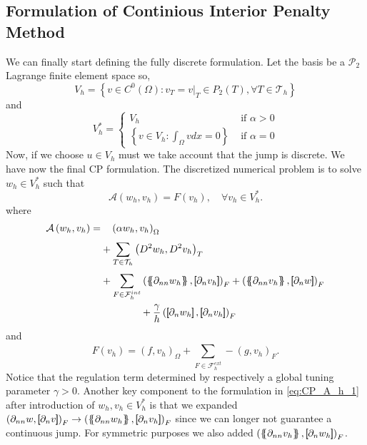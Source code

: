 \subsection{Formulation of Continious Interior Penalty Method}%
\label{sub:formulation_of_continious_interior_penalty_method}


We can finally start defining the fully discrete formulation. Let the basis be a $\mathcal{P}_{2} $ Lagrange finite element space so,
\[
V_{h} = \left\{ v \in C^{0}\left( \Omega  \right): v_{T} = v | _{T} \in P_{2}\left( T \right), \forall T \in
\mathcal{T}_{h}    \right\}
\]
and
\[
V_{h}^{*} = \begin{cases}
    V_{h} & \text{ if } \alpha  > 0 \\
    \left\{ v \in V_{h}: \int_{\Omega }^{} v dx   = 0   \right\} &  \text{ if } \alpha   = 0
\end{cases}
\]
Now, if we choose $u \in V_{h}$ must we take account that the jump is discrete.
 We have now the final CP formulation.
The discretized numerical problem is to solve $w_{h} \in V_{h}^{*}$ such that
\begin{equation}
\label{eq:CP_A_F}
\mathcal{A}\left( w_{h}, v_{h} \right)   = F\left( v_{h} \right), \quad \forall v_{h} \in V_{h}^{*}  .
\end{equation}
where
\begin{equation}
\label{eq:CP_A_h_1}
\begin{split}
\mathcal{A} \left( w_{h}, v_{h} \right)   =&
  \quad  \left( \alpha  w_{h}, v_{h} \right) _{\Omega }\\
&  + \sum_{T \in \mathcal{T} _{h}}^{} \left( D^2 w_{h}, D^2v_{h} \right) _{T} \\
 & +
  \sum_{F \in \mathcal{F}_{h}^{int} }^{}
  \left( \mean{  \partial _{n n} w_{h} }, \jump{ \partial _{n }v_{h}} \right)_{F}  +
 \left( \mean{ \partial _{n n} v_{h} }, \jump{ \partial _{n}w }      \right)_{F} \\
& \quad \quad \quad \quad  + \frac{\gamma}{h}  \left( \jump{ \partial _{n} w_{h}}, \jump{ \partial _{n} v_{h}   }   \right)_{F}
\end{split}
\end{equation}
and
\begin{equation}
\label{eq:CP_F_h}
F\left( v_{h} \right)  = \left( f, v_{h} \right) _{\Omega } +  \sum_ {F \in \mathcal{F}_{h} ^{ext}}^{} - \left(g, v_{h}  \right) _{F}.
\end{equation}
Notice that the regulation term determined by respectively a global tuning parameter $\gamma >0 $. Another key component to the formulation
in \eqref{eq:CP_A_h_1} after introduction of $ w_{h}, v_{h} \in V^{*}_{h}$  is that we expanded $\left( \partial _{nn}w, \jump{ \partial _{n} v }  \right)_{F} \to \left( \mean{ \partial _{nn}w_{h} }  , \jump{ \partial _{n} v_{h} }  \right)_{F} $ since we can longer not guarantee a
continuous jump. For symmetric purposes we also added $ \left( \mean{ \partial _{nn} v_{h}}  , \jump{ \partial _{n} w_{h} }  \right)_{F} $.

